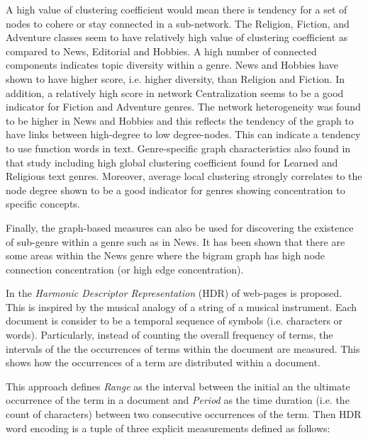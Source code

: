 A high value of clustering coefficient would mean there is tendency for a set of nodes to cohere or stay connected in a sub-network. The Religion, Fiction, and Adventure classes seem to have relatively high value of clustering coefficient as compared to News, Editorial and Hobbies. A high number of connected components indicates topic diversity within a genre. News and Hobbies have shown to have higher score, i.e. higher diversity, than Religion and Fiction. In addition, a relatively high score in network Centralization seems to be a good indicator for Fiction and Adventure genres. The network heterogeneity was found to be higher in News and Hobbies and this reflects the tendency of the graph to have links between high-degree to low degree-nodes. This can indicate a tendency to use function words in text. Genre-specific graph characteristics also found in that study \parencite{nabhan2016graph} including high global clustering coefficient found for Learned and Religious text genres. Moreover, average local clustering strongly correlates to the node degree shown to be a good indicator for genres showing concentration to specific concepts.

Finally, the graph-based measures can also be used for discovering the existence of sub-genre within a genre such as in News. It has been shown that there are some areas within the News genre where the bigram graph has high node connection concentration (or high edge concentration).  

In \parencite{kim2010formulating} the \textit{Harmonic Descriptor Representation} (HDR) of web-pages is proposed. This is inspired by the musical analogy of a string of a musical instrument. Each document is consider to be a temporal sequence of symbols (i.e. characters or words). Particularly, instead of counting the overall frequency of terms,  the intervals of the the occurrences of terms within the document are measured. This shows how the occurrences of a term are distributed within a document.

This approach defines \textit{Range} as the interval between the initial an the ultimate occurrence of the term in a document and \textit{Period} as the time duration (i.e. the count of characters) between two consecutive occurrences of the term. Then HDR word encoding is a tuple of three explicit measurements defined as follows:


